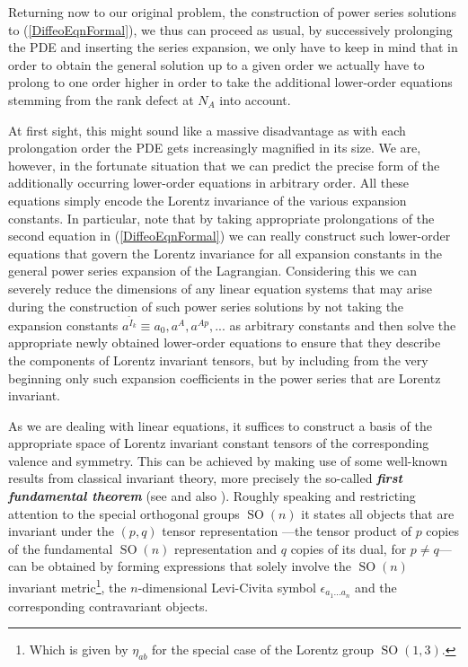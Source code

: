 Returning now to our original problem, the construction of power series solutions to (\ref{DiffeoEqnFormal}), we thus can proceed as usual, by successively prolonging the PDE and inserting the series expansion, we only have to keep in mind that in order to obtain the general solution up to a given order we actually have to prolong to one order higher in order to take the additional lower-order equations stemming from the rank defect at $N_A$ into account. 

At first sight, this might sound like a massive disadvantage as with each prolongation order the PDE gets increasingly magnified in its size. We are, however, in the fortunate situation that we can predict the precise form of the additionally occurring lower-order equations in arbitrary order. All these equations simply encode the Lorentz invariance of the various expansion constants. In particular, note that by taking appropriate prolongations of the second equation in (\ref{DiffeoEqnFormal}) we can really construct such lower-order equations that govern the Lorentz invariance for all expansion constants in the general power series expansion of the Lagrangian. 
Considering this we can severely reduce the dimensions of any linear equation systems that may arise during the construction of such power series solutions by not taking the expansion constants $a^{\tilde{I}_k} \equiv a_0, a^A, a^{Ap},...$ as arbitrary constants and then solve the appropriate newly obtained lower-order equations to ensure that they describe the components of Lorentz invariant tensors, but by including from the very beginning only such expansion coefficients in the power series that are Lorentz invariant.

As we are dealing with linear equations, it suffices to construct a basis of the appropriate space of Lorentz invariant constant tensors of the corresponding valence and symmetry. This can be achieved by making use of some well-known results from classical invariant theory, more precisely the so-called \textit{\textbf{first fundamental theorem}} (see \cite{Aslaksen1995InvariantTO} and also \cite{PROCESI1976306}). Roughly speaking and restricting attention to the special orthogonal groups $\operatorname{SO}(n)$ it states all objects that are invariant under the $(p,q)$ tensor representation ---the tensor product of $p$ copies of the fundamental $\operatorname{SO}(n)$ representation and $q$ copies of its dual, for $p \neq q$--- can be obtained by forming expressions that solely involve the $\operatorname{SO}(n)$ invariant metric\footnote{Which is given by $\eta_{ab}$ for the special case of the Lorentz group $\operatorname{SO}(1,3)$.}, the $n$-dimensional Levi-Civita symbol $\epsilon_{a_1...a_n}$ and the corresponding contravariant objects. 

